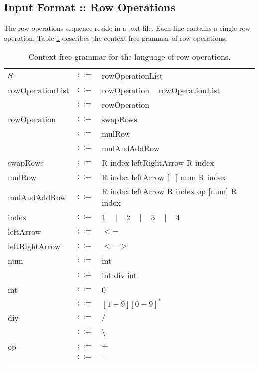 \documentclass{article}
\begin{document}
\subsection*{Input Format :: Row Operations}
The row operations sequence reside in a text file.
Each line contains a single row operation.
Table \ref{Table_CFG_Of_Row_Operations}
describes the context free grammar of row operations.
\begin{table}[h]
\centering
\begin{tabular}{ l c l }
  $S$              & $::=$ & rowOperationList                            \\
  rowOperationList & $::=$ & rowOperation ~ rowOperationList             \\
                   & $::=$ & rowOperation                                \\
  rowOperation     & $::=$ & swapRows                                    \\
                   & $::=$ & mulRow                                      \\
                   & $::=$ & mulAndAddRow                                \\
  swapRows         & $::=$ & R index leftRightArrow R index              \\
  mulRow           & $::=$ & R index leftArrow [$-$] num R index         \\
  mulAndAddRow     & $::=$ & R index leftArrow R index op [num] R index  \\
  index            & $::=$ & 1 ~ $|$ ~ 2 ~ $|$ ~ 3 ~ $|$ ~ 4             \\
  leftArrow        & $::=$ & $<-$                                        \\
  leftRightArrow   & $::=$ & $<->$                                       \\
  num              & $::=$ & int                                         \\
                   & $::=$ & int div int                                 \\
  int              & $::=$ & 0                                           \\
                   & $::=$ & $[1-9][0-9]^{*}$                            \\
  div              & $::=$ & $/$                                         \\
                   & $::=$ & \textbackslash                              \\
  op               & $::=$ & $+$                                         \\
                   & $::=$ & $-$                                         \\ \\ \\
\end{tabular}
\caption{
Context free grammar for the language of row operations.
\label{Table_CFG_Of_Row_Operations}}
\end{table}
\end{document}
